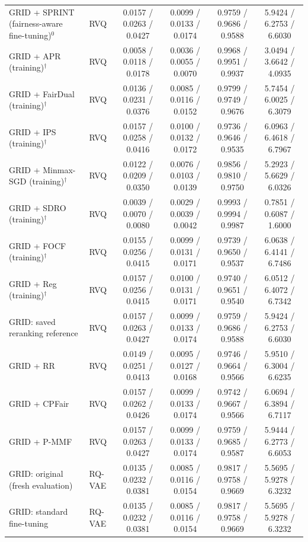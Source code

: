 \begin{table}[p]
{\begin{tabular}{llcccc}
GRID + SPRINT (fairness-aware fine-tuning)$^{0}$ & RVQ & 0.0157 / 0.0263 / 0.0427 & 0.0099 / 0.0133 / 0.0174 & 0.9759 / 0.9686 / 0.9588 & 5.9424 / 6.2753 / 6.6030 \\
GRID + APR (training)$^{\dagger}$ & RVQ & 0.0058 / 0.0118 / 0.0178 & 0.0036 / 0.0055 / 0.0070 & 0.9968 / 0.9951 / 0.9937 & 3.0494 / 3.6642 / 4.0935 \\
GRID + FairDual (training)$^{\dagger}$ & RVQ & 0.0136 / 0.0231 / 0.0376 & 0.0085 / 0.0116 / 0.0152 & 0.9799 / 0.9749 / 0.9676 & 5.7454 / 6.0025 / 6.3079 \\
GRID + IPS (training)$^{\dagger}$ & RVQ & 0.0157 / 0.0258 / 0.0416 & 0.0100 / 0.0132 / 0.0172 & 0.9736 / 0.9646 / 0.9535 & 6.0963 / 6.4618 / 6.7967 \\
GRID + Minmax-SGD (training)$^{\dagger}$ & RVQ & 0.0122 / 0.0209 / 0.0350 & 0.0076 / 0.0103 / 0.0139 & 0.9856 / 0.9810 / 0.9750 & 5.2923 / 5.6629 / 6.0326 \\
GRID + SDRO (training)$^{\dagger}$ & RVQ & 0.0039 / 0.0070 / 0.0080 & 0.0029 / 0.0039 / 0.0042 & 0.9993 / 0.9994 / 0.9987 & 0.7851 / 0.6087 / 1.6000 \\
GRID + FOCF (training)$^{\dagger}$ & RVQ & 0.0155 / 0.0256 / 0.0415 & 0.0099 / 0.0131 / 0.0171 & 0.9739 / 0.9650 / 0.9537 & 6.0638 / 6.4141 / 6.7486 \\
GRID + Reg (training)$^{\dagger}$ & RVQ & 0.0157 / 0.0256 / 0.0415 & 0.0100 / 0.0131 / 0.0171 & 0.9740 / 0.9651 / 0.9540 & 6.0512 / 6.4072 / 6.7342 \\
GRID: saved reranking reference & RVQ & 0.0157 / 0.0263 / 0.0427 & 0.0099 / 0.0133 / 0.0174 & 0.9759 / 0.9686 / 0.9588 & 5.9424 / 6.2753 / 6.6030 \\
GRID + RR & RVQ & 0.0149 / 0.0251 / 0.0413 & 0.0095 / 0.0127 / 0.0168 & 0.9746 / 0.9664 / 0.9566 & 5.9510 / 6.3004 / 6.6235 \\
GRID + CPFair & RVQ & 0.0157 / 0.0262 / 0.0426 & 0.0099 / 0.0133 / 0.0174 & 0.9742 / 0.9667 / 0.9566 & 6.0694 / 6.3894 / 6.7117 \\
GRID + P-MMF & RVQ & 0.0157 / 0.0263 / 0.0427 & 0.0099 / 0.0133 / 0.0174 & 0.9759 / 0.9685 / 0.9587 & 5.9444 / 6.2773 / 6.6053 \\
\midrule
GRID: original (fresh evaluation) & RQ-VAE & 0.0135 / 0.0232 / 0.0381 & 0.0085 / 0.0116 / 0.0154 & 0.9817 / 0.9758 / 0.9669 & 5.5695 / 5.9278 / 6.3232 \\
GRID: standard fine-tuning & RQ-VAE & 0.0135 / 0.0232 / 0.0381 & 0.0085 / 0.0116 / 0.0154 & 0.9817 / 0.9758 / 0.9669 & 5.5695 / 5.9278 / 6.3232 \\

\end{tabular}}
\end{table}
